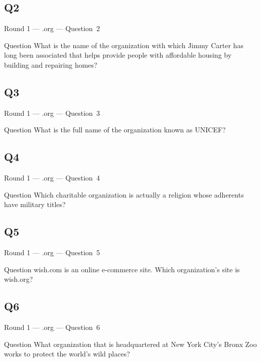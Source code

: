 \documentclass[11pt]{beamer}
\begin{document}
\subsection*{Q2}
\begin{frame}[t]{Round 1 --- .org --- \mbox{Question 2}}
\vspace{-0.5em}
\begin{block}{Question}
What is the name of the organization with which Jimmy Carter has long been associated that helps provide people with affordable housing by building and repairing homes?
\end{block}
\end{frame}
\subsection*{Q3}
\begin{frame}[t]{Round 1 --- .org --- \mbox{Question 3}}
\vspace{-0.5em}
\begin{block}{Question}
What is the full name of the organization known as UNICEF\@?
\end{block}
\end{frame}
\subsection*{Q4}
\begin{frame}[t]{Round 1 --- .org --- \mbox{Question 4}}
\vspace{-0.5em}
\begin{block}{Question}
Which charitable organization is actually a religion whose adherents have military titles?
\end{block}
\end{frame}
\subsection*{Q5}
\begin{frame}[t]{Round 1 --- .org --- \mbox{Question 5}}
\vspace{-0.5em}
\begin{block}{Question}
wish.com is an online e-commerce site. Which organization's site is wish.org?
\end{block}
\end{frame}
\subsection*{Q6}
\begin{frame}[t]{Round 1 --- .org --- \mbox{Question 6}}
\vspace{-0.5em}
\begin{block}{Question}
What organization that is headquartered at New York City's Bronx Zoo works to protect the world's wild places?
\end{block}
\end{frame}
\end{document}
